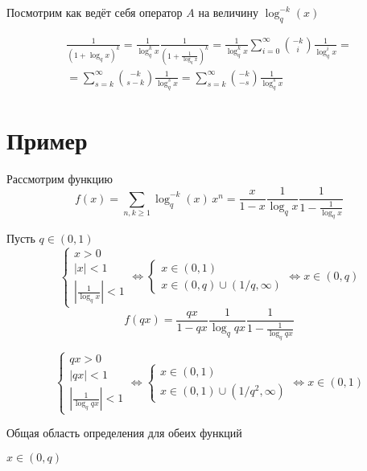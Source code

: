 \documentclass{article}
\begin{document}
	
	
	Посмотрим как ведёт себя оператор $A$ на величину $\log_q^{-k}(x)$
	
	\begin{multline}
		\frac{1}{(1+\log_q x)^{k}} = \frac{1}{\log_q^k x} \frac{1}{(1+\frac{1}{\log_q x})^k} = \frac{1}{\log_q^k x} \sum_{i=0}^\infty \binom{-k}{i} \frac{1}{\log_q^i x} =\\
		= \sum_{s=k}^\infty \binom{-k}{s-k}\frac{1}{\log_q^s x} = \sum_{s=k}^\infty \binom{-k}{-s}\frac{1}{\log_q^s x}
	\end{multline}
	
	
	
	
	\section{Пример}
	
	Рассмотрим функцию
	\[f(x) = \sum_{n,k\geq 1} \log_q^{-k} (x) \, x^n = \frac{x}{1-x} \frac{1}{\log_q x} \frac{1}{1-\frac{1}{\log_q x}}\]
	
	Пусть $q \in (0,1)$
	\begin{equation}
		\begin{cases}
			x > 0\\
			|x| < 1 \\
			| \frac{1}{\log_q x} |<1
		\end{cases}
		\Leftrightarrow
		\begin{cases}
			x \in (0,1)\\
			x \in (0,q) \cup (1/q,\infty)
		\end{cases}
		\Leftrightarrow
		x \in (0,q)    
	\end{equation}
	\[f(qx) =\frac{qx}{1-qx} \frac{1}{\log_q qx} \frac{1}{1-\frac{1}{\log_q qx}} \]
	
	\begin{equation}
		\begin{cases}
			q x > 0\\
			|q x| < 1\\
			| \frac{1}{\log_q qx} |<1
		\end{cases}
		\Leftrightarrow
		\begin{cases}
			x \in (0,1)\\
			x \in (0,1) \cup (1/q^2,\infty)
		\end{cases}
		\Leftrightarrow x \in (0,1)
	\end{equation}
	
	Общая область определения для обеих функций
	
	$x \in (0,q)$
	
\end{document}
